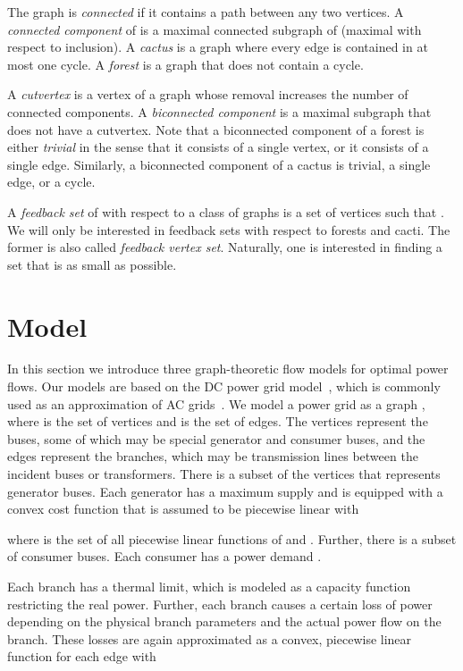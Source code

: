 \documentclass{article}[11pt,a4paper]
\begin{document}
The graph  is \emph{connected} if it contains a path between any
two vertices.  A \emph{connected component} of  is a maximal
connected subgraph of  (maximal with respect to inclusion).  A
\emph{cactus} is a graph where every edge is contained in at most one
cycle.  A \emph{forest} is a graph that does not contain a cycle.

A \emph{cutvertex} is a vertex of a graph whose removal increases the
number of connected components.  A \emph{biconnected component} is a
maximal subgraph that does not have a cutvertex.  Note that a
biconnected component of a forest is either \emph{trivial} in the
sense that it consists of a single vertex, or it consists of a single
edge.  Similarly, a biconnected component of a cactus is trivial, a
single edge, or a cycle.

A \emph{feedback set} of  with respect to a class of graphs
 is a set of vertices  such that .  We will only be interested in feedback sets with respect
to forests and cacti.  The former is also called \emph{feedback vertex
  set}.  Naturally, one is interested in finding a set  that is as
small as possible.
\section{Model}
\label{sec:model}
In this section we introduce three graph-theoretic flow models for optimal power flows.
Our models are based on the DC power grid model~\cite{Hammerstrom2007, Zimmerman2011a,sja-dcpfr-09}, which is commonly used as an approximation of AC grids~\cite{Purchala2005,ocs-acdc-04}.
We model a power grid as a graph , where  is the set of vertices and  is the set of edges. The vertices represent the buses, some of which may be special generator and consumer buses, and the edges represent the branches, which may be transmission lines between the incident buses or transformers.
There is a subset  of the vertices that represents generator buses.
Each generator  has a maximum supply  and is equipped with a convex cost function  that is assumed to be piecewise linear with

where  is the set of all piecewise linear functions of  and . 
Further, there is a subset  of consumer buses.
Each consumer  has a power demand .

Each branch  has a thermal limit, which is modeled as a capacity function  restricting the real power. 
Further, each branch causes a certain loss of power depending on the physical branch parameters and the actual power flow on the branch. 
These losses are again approximated as a convex, piecewise linear function  for each edge  with
\end{document}
